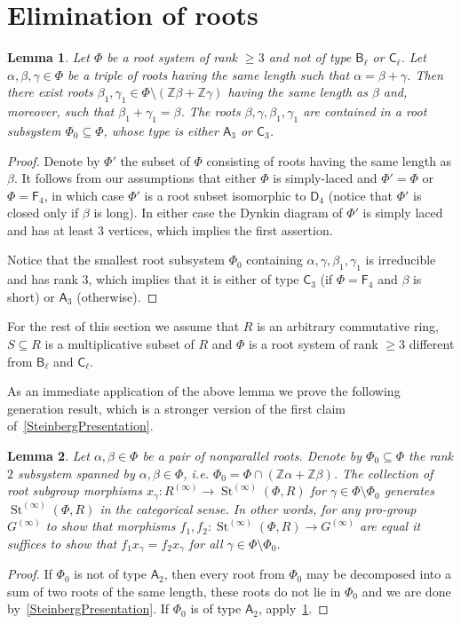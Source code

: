 \documentclass{article}
\numberwithin{equation}{section}
\newtheorem{lemma}{Lemma} \numberwithin{lemma}{section}
\theoremstyle{definition}
\theoremstyle{remark}
\DeclareMathOperator\St{St}
\newcommand{\ZZ}{\mathbb{Z}}
\newcommand{\rA}{\mathsf{A}}
\newcommand{\rB}{\mathsf{B}}
\newcommand{\rC}{\mathsf{C}}
\newcommand{\rD}{\mathsf{D}}
\newcommand{\rF}{\mathsf{F}}
\begin{document}
\section{Elimination of roots}
\begin{lemma}\label{ThreeRoots}
Let \(\Phi\) be a root system of rank \(\geq 3\) and not of type \(\rB_\ell\) or \(\rC_\ell\). Let \(\alpha, \beta, \gamma \in \Phi\) be a triple of roots having the same length such that $\alpha = \beta + \gamma$.  
Then there exist roots \(\beta_1, \gamma_1 \in \Phi \setminus (\ZZ\beta + \ZZ\gamma)\) having the same length as $\beta$ and, moreover, such that \(\beta_1 + \gamma_1 = \beta\). The roots $\beta, \gamma, \beta_1, \gamma_1$ are contained in a root subsystem $\Phi_0 \subseteq \Phi$, whose type is either \(\rA_3\) or \(\rC_3\). \end{lemma}
\begin{proof}
Denote by $\Phi'$ the subset of $\Phi$ consisting of roots having the same length as $\beta$.
It follows from our assumptions that either $\Phi$ is simply-laced and $\Phi' = \Phi$ or $\Phi = \rF_4$, in which case $\Phi'$ is a root subset isomorphic to $\rD_4$ (notice that $\Phi'$ is closed only if $\beta$ is long). In either case the Dynkin diagram of $\Phi'$ is simply laced and has at least $3$ vertices, which implies the first assertion.

Notice that the smallest root subsystem $\Phi_0$ containing $\alpha, \gamma, \beta_1, \gamma_1$ is irreducible and has rank $3$, which implies that it is either of type  $\rC_3$ (if $\Phi = \rF_4$ and $\beta$ is short) or $\rA_3$ (otherwise). \end{proof}

For the rest of this section we assume that \(R\) is an arbitrary commutative ring, 
 \(S \subseteq R\) is a multiplicative subset of $R$ and \(\Phi\) is a root system of rank \(\geq 3\) different from \(\rB_\ell\) and \(\rC_\ell\). 

As an immediate application of the above lemma we prove the following generation result, which is a stronger version of the first claim of~\cref{SteinbergPresentation}.
 \begin{lemma}\label{DoubleRootElimination}  
  Let $\alpha, \beta \in \Phi$ be a pair of nonparallel roots. Denote by \(\Phi_0 \subseteq \Phi\) the rank \(2\) subsystem spanned by $\alpha, \beta \in \Phi$, i.e. \(\Phi_0 = \Phi \cap (\ZZ\alpha + \ZZ\beta)\). The collection of root subgroup morphisms $x_\gamma \colon R^{(\infty)} \to \St^{(\infty)}(\Phi, R)$ for $\gamma \in \Phi\setminus \Phi_0$ generates $\St^{(\infty)}(\Phi, R)$ in the categorical sense. In other words, for any pro-group $G^{(\infty)}$ to show that morphisms $f_1, f_2 \colon \St^{(\infty)}(\Phi, R) \to G^{(\infty)}$ are equal it suffices to show that $f_1x_\gamma = f_2x_\gamma$ for all $\gamma \in \Phi\setminus\Phi_0$.
 \end{lemma}
 \begin{proof}
  If \(\Phi_0\) is not of type \(\rA_2\), then every root from \(\Phi_0\) may be decomposed into a sum of two roots of the same length, these roots do not lie in \(\Phi_0\) and we are done by~\cref{SteinbergPresentation}. If \(\Phi_0\) is of type \(\rA_2\), apply~\cref{ThreeRoots}.
 \end{proof}
\end{document}
